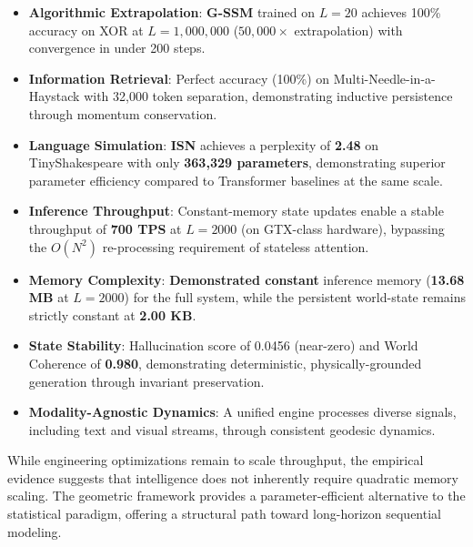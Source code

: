 \documentclass[12pt,a4paper]{article}
\begin{document}
\begin{itemize}
    \item \textbf{Algorithmic Extrapolation}: \textbf{G-SSM} trained on $L=20$ achieves 100\% accuracy on XOR at $L=1,000,000$ ($50,000\times$ extrapolation) with convergence in under 200 steps.

    \item \textbf{Information Retrieval}: Perfect accuracy (100\%) on Multi-Needle-in-a-Haystack with 32,000 token separation, demonstrating inductive persistence through momentum conservation.
    \item \textbf{Language Simulation}: \textbf{ISN} achieves a perplexity of \textbf{2.48} on TinyShakespeare with only \textbf{363,329 parameters}, demonstrating superior parameter efficiency compared to Transformer baselines at the same scale.
    \item \textbf{Inference Throughput}: Constant-memory state updates enable a stable throughput of \textbf{700 TPS} at $L=2000$ (on GTX-class hardware), bypassing the $O(N^2)$ re-processing requirement of stateless attention.
    \item \textbf{Memory Complexity}: \textbf{Demonstrated constant} inference memory (\textbf{13.68 MB} at $L=2000$) for the full system, while the persistent world-state remains strictly constant at \textbf{2.00 KB}.
    \item \textbf{State Stability}: Hallucination score of 0.0456 (near-zero) and World Coherence of \textbf{0.980}, demonstrating deterministic, physically-grounded generation through invariant preservation.

    \item \textbf{Modality-Agnostic Dynamics}: A unified engine processes diverse signals, including text and visual streams, through consistent geodesic dynamics.
\end{itemize}

While engineering optimizations remain to scale throughput, the empirical evidence suggests that intelligence does not inherently require quadratic memory scaling. The geometric framework provides a parameter-efficient alternative to the statistical paradigm, offering a structural path toward long-horizon sequential modeling.
\end{document}
